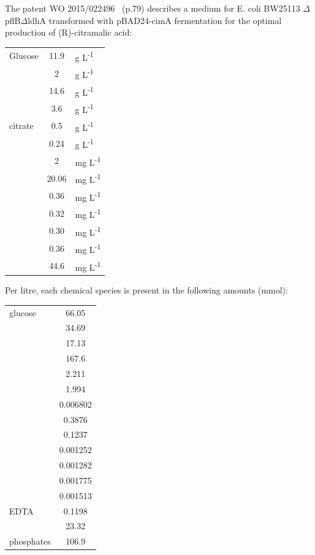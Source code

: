 \documentclass[parskip=full]{scrreprt}
\begin{document}
The patent WO 2015/022496~\cite{eastham_process_2015} (p.79) describes a medium for E. coli BW25113 $\Delta$pflB$\Delta$ldhA transformed with pBAD24-cimA fermentation for the optimal production of (R)-citramalic acid:

\begin{tabular}{lSl}
  Glucose & 11.9 & g L\textsuperscript{-1}\\
   & 2 & g L\textsuperscript{-1}\\
   & 14.6 & g L\textsuperscript{-1}\\
   & 3.6 & g L\textsuperscript{-1}\\
   citrate & 0.5 & g L\textsuperscript{-1}\\
   & 0.24 & g L\textsuperscript{-1}\\
   & 2 & mg L\textsuperscript{-1}\\
   & 20.06 & mg L\textsuperscript{-1}\\
   & 0.36 & mg L\textsuperscript{-1}\\
   & 0.32 & mg L\textsuperscript{-1}\\
   & 0.30 & mg L\textsuperscript{-1}\\
   & 0.36 & mg L\textsuperscript{-1}\\
   & 44.6 & mg L\textsuperscript{-1}
\end{tabular}

Per litre, each chemical species is present in the following amounts (mmol):

\begin{tabular}{lS}
  glucose & 66.05\\
   & 34.69\\
   & 17.13\\
   & 167.6\\
   & 2.211\\
   & 1.994\\
   & 0.006802\\
   & 0.3876\\
   & 0.1237\\
   & 0.001252\\
   & 0.001282\\
   & 0.001775\\
   & 0.001513\\
  EDTA & 0.1198\\
   & 23.32\\
  phosphates & 106.9
\end{tabular}
\end{document}

